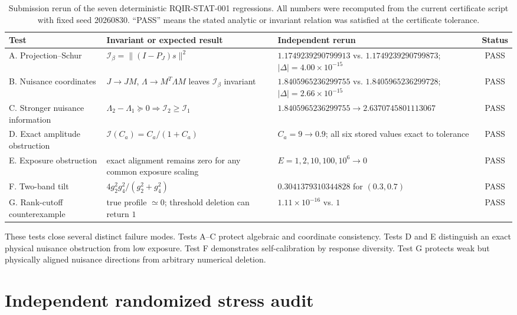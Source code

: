 \begin{table}[t]
\caption{Submission rerun of the seven deterministic RQIR-STAT-001 regressions. All numbers were recomputed from the current certificate script with fixed seed 20260830. ``PASS'' means the stated analytic or invariant relation was satisfied at the certificate tolerance.}
\label{tab:certificate}
\begin{ruledtabular}
\begin{tabular}{p{}p{}p{}c}
Test & Invariant or expected result & Independent rerun & Status\\
\hline
A. Projection--Schur & $\mathcal I_\beta=\|(I-P_J)s\|^2$ & $1.1749239290799913$ vs. $1.1749239290799873$; $|\Delta|=4.00\times10^{-15}$ & PASS\\
B. Nuisance coordinates & $J\to JM$, $\Lambda\to M^T\Lambda M$ leaves $\mathcal I_\beta$ invariant & $1.8405965236299755$ vs. $1.8405965236299728$; $|\Delta|=2.66\times10^{-15}$ & PASS\\
C. Stronger nuisance information & $\Lambda_2-\Lambda_1\succeq0\Rightarrow \mathcal I_2\ge\mathcal I_1$ & $1.8405965236299755\to2.6370745801113067$ & PASS\\
D. Exact amplitude obstruction & $\mathcal I(C_a)=C_a/(1+C_a)$ & $C_a=9\to0.9$; all six stored values exact to tolerance & PASS\\
E. Exposure obstruction & exact alignment remains zero for any common exposure scaling & $E=1,2,10,100,10^6\to0$ & PASS\\
F. Two-band tilt & $4g_2^2g_4^2/(g_2^2+g_4^2)$ & $0.3041379310344828$ for $(0.3,0.7)$ & PASS\\
G. Rank-cutoff counterexample & true profile $\simeq0$; threshold deletion can return $1$ & $1.11\times10^{-16}$ vs. $1$ & PASS\\
\end{tabular}
\end{ruledtabular}
\end{table}

These tests close several distinct failure modes. Tests A--C protect algebraic and coordinate consistency. Tests D and E distinguish an exact physical nuisance obstruction from low exposure. Test F demonstrates self-calibration by response diversity. Test G protects weak but physically aligned nuisance directions from arbitrary numerical deletion.

\section{Independent randomized stress audit}
\label{sec:stress}

